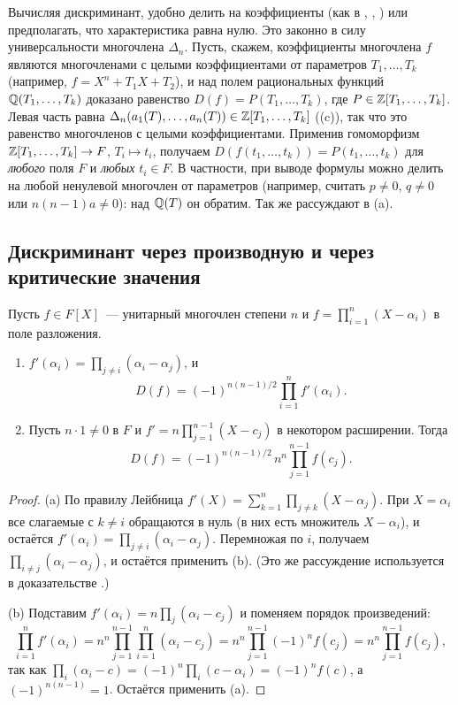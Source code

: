 \begin{remark}
Вычисляя дискриминант, удобно делить на коэффициенты (как в , , ) или предполагать, что
характеристика равна нулю. Это законно в силу универсальности многочлена $\Delta_n$. Пусть, скажем, коэффициенты
многочлена $f$ являются многочленами с целыми коэффициентами от параметров $T_1,\dots,T_k$ (например,
$f=X^n+T_1X+T_2$), и над полем рациональных функций $\mathbb Q(T_1,\dots,T_k)$ доказано равенство $D(f)=P(T_1,\dots,T_k)$, где
$P\in\mathbb Z[T_1,\dots,T_k]$. Левая часть равна $\Delta_n(a_1(T),\dots,a_n(T))\in\mathbb Z[T_1,\dots,T_k]$ ((c)), так что это
равенство многочленов с целыми коэффициентами. Применив гомоморфизм $\mathbb Z[T_1,\dots,T_k]\to F$, $T_i\mapsto t_i$, получаем
$D(f(t_1,\dots,t_k))=P(t_1,\dots,t_k)$ для \emph{любого} поля $F$ и \emph{любых} $t_i\in F$. В частности, при выводе формулы
можно делить на любой ненулевой многочлен от параметров (например, считать $p\ne0$, $q\ne0$ или $n(n-1)a\ne0$): над
$\mathbb Q(T)$ он обратим. Так же рассуждают в (a).
\end{remark}

\subsection*{Дискриминант через производную и через критические значения}

\begin{proposition}[4.2d]
Пусть $f\in F[X]$~--- унитарный многочлен степени $n$ и $f=\prod_{i=1}^n(X-\alpha_i)$ в поле разложения.
\begin{enumerate}[label=\textup{(\alph*)}]
\item $f'(\alpha_i)=\prod_{j\ne i}(\alpha_i-\alpha_j)$, и
\[
D(f)=(-1)^{n(n-1)/2}\prod_{i=1}^nf'(\alpha_i).
\]
\item Пусть $n\cdot1\ne0$ в $F$ и $f'=n\prod_{j=1}^{n-1}(X-c_j)$ в некотором расширении. Тогда
\[
D(f)=(-1)^{n(n-1)/2}\,n^n\prod_{j=1}^{n-1}f(c_j).
\]
\end{enumerate}
\end{proposition}

\begin{proof}
(a) По правилу Лейбница $f'(X)=\sum_{k=1}^n\prod_{j\ne k}(X-\alpha_j)$. При $X=\alpha_i$ все слагаемые с $k\ne i$
обращаются в нуль (в них есть множитель $X-\alpha_i$), и остаётся $f'(\alpha_i)=\prod_{j\ne i}(\alpha_i-\alpha_j)$. Перемножая
по $i$, получаем $\prod_{i\ne j}(\alpha_i-\alpha_j)$, и остаётся применить (b). (Это же рассуждение используется в
доказательстве .)

(b) Подставим $f'(\alpha_i)=n\prod_j(\alpha_i-c_j)$ и поменяем порядок произведений:
\[
\prod_{i=1}^nf'(\alpha_i)=n^n\prod_{j=1}^{n-1}\prod_{i=1}^n(\alpha_i-c_j)=n^n\prod_{j=1}^{n-1}(-1)^nf(c_j)
=n^n\prod_{j=1}^{n-1}f(c_j),
\]
так как $\prod_i(\alpha_i-c)=(-1)^n\prod_i(c-\alpha_i)=(-1)^nf(c)$, а $(-1)^{n(n-1)}=1$. Остаётся применить (a).
\end{proof}


